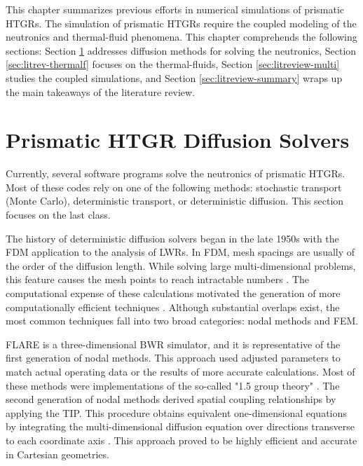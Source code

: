 This chapter summarizes previous efforts in numerical simulations of prismatic HTGRs.
The simulation of prismatic HTGRs require the coupled modeling of the neutronics and thermal-fluid phenomena.
This chapter comprehends the following sections: Section \ref{sec:litreview-neut} addresses diffusion methods for solving the neutronics, Section \ref{sec:litrev-thermalf} focuses on the thermal-fluids, Section \ref{sec:litreview-multi} studies the coupled simulations, and Section \ref{sec:litreview-summary} wraps up the main takeaways of the literature review.

\section{Prismatic HTGR Diffusion Solvers}
\label{sec:litreview-neut}

Currently, several software programs solve the neutronics of prismatic \glspl{HTGR}.
Most of these codes rely on one of the following methods: stochastic transport (Monte Carlo), deterministic transport, or deterministic diffusion.
This section focuses on the last class.

The history of deterministic diffusion solvers began in the late 1950s with the \gls{FDM} application to the analysis of \glspl{LWR}.
In \gls{FDM}, mesh spacings are usually of the order of the diffusion length.
While solving large multi-dimensional problems, this feature causes the mesh points to reach intractable numbers \cite{lewis_finite_1986}.
The computational expense of these calculations motivated the generation of more computationally efficient techniques \cite{lawrence_progress_1986}.
Although substantial overlaps exist, the most common techniques fall into two broad categories: nodal methods and \gls{FEM}.

FLARE \cite{delp_flare_1964} is a three-dimensional \gls{BWR} simulator, and it is representative of the first generation of nodal methods.
This approach used adjusted parameters to match actual operating data or the results of more accurate calculations.
Most of these methods were implementations of the so-called "1.5 group theory" \cite{gupta_nodal_1981}.
The second generation of nodal methods derived spatial coupling relationships by applying the \gls{TIP}.
This procedure obtains equivalent one-dimensional equations by integrating the multi-dimensional diffusion equation over directions transverse to each coordinate axis \cite{lawrence_progress_1986}.
This approach proved to be highly efficient and accurate in Cartesian geometries.

